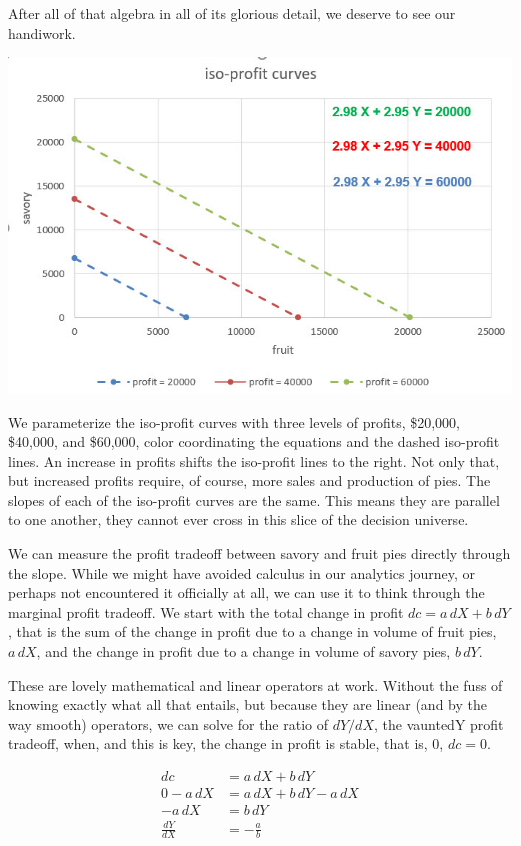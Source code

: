 \documentclass[
]{book}
\begin{document}
After all of that algebra in all of its glorious detail, we deserve to see our handiwork.

\includegraphics{images/03/pie-2-product-iso-profit.jpg}

We parameterize the iso-profit curves with three levels of profits, \$20,000, \$40,000, and \$60,000, color coordinating the equations and the dashed iso-profit lines. An increase in profits shifts the iso-profit lines to the right. Not only that, but increased profits require, of course, more sales and production of pies. The slopes of each of the iso-profit curves are the same. This means they are parallel to one another, they cannot ever cross in this slice of the decision universe.

We can measure the profit tradeoff between savory and fruit pies directly through the slope. While we might have avoided calculus in our analytics journey, or perhaps not encountered it officially at all, we can use it to think through the marginal profit tradeoff. We start with the total change in profit \(dc = a\, dX + b\, dY\), that is the sum of the change in profit due to a change in volume of fruit pies, \(a\, dX\), and the change in profit due to a change in volume of savory pies, \(b\, dY\).

These are lovely mathematical and linear operators at work. Without the fuss of knowing exactly what all that entails, but because they are linear (and by the way smooth) operators, we can solve for the ratio of \(dY/dX\), the vauntedY profit tradeoff, when, and this is key, the change in profit is stable, that is, 0, \(dc=0\).

\[
\begin{align}
dc &= a\, dX + b\, dY \\
0 - a\, dX &= a\, dX + b\, dY - a\, dX \\
- a\, dX &= b\, dY \\
\frac{dY}{dX} &= -\frac{a}{b}
\end{align}
\]
\end{document}
